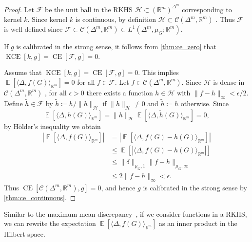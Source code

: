 \documentclass{article}
\DeclareMathOperator{\Expect}{\mathbb{E}}
\DeclareMathOperator{\measure}{CE}
\DeclareMathOperator{\kernelmeasure}{KCE}
\begin{document}
\begin{proof}
  Let $\mathcal{F}$ be the unit ball in the RKHS
  $\mathcal{H} \subset {(\mathbb{R}^m)}^{\Delta^m}$ corresponding to kernel $k$.
  Since kernel $k$ is continuous, by definition
  $\mathcal{H} \subset \mathcal{C}(\Delta^m, \mathbb{R}^m)$
  \citep[Definition~1]{carmeli10_vector_valued_reprod_kernel_hilber_spaces_univer}.
  Thus $\mathcal{F}$ is well defined since
  $\mathcal{F} \subset \mathcal{C}(\Delta^m, \mathbb{R}^m) \subset L^1(\Delta^m, \mu_G; \mathbb{R}^m)$.

  If $g$ is calibrated in the strong sense, it follows from \cref{thm:ce_zero}
  that $\kernelmeasure[k, g] = \measure[\mathcal{F}, g] = 0$.

  Assume that $\kernelmeasure[k, g] = \measure[\mathcal{F}, g] = 0$. This
  implies $\Expect[\langle \Delta, f(G)\rangle_{\mathbb{R}^m}] = 0$ for all
  $f \in \mathcal{F}$. Let $f \in \mathcal{C}(\Delta^m, \mathbb{R}^m)$. Since
  $\mathcal{H}$ is dense in $\mathcal{C}(\Delta^m, \mathbb{R}^m)$
  \citep[Theorem~1]{carmeli10_vector_valued_reprod_kernel_hilber_spaces_univer},
  for all $\epsilon > 0$ there exists a function $h \in \mathcal{H}$ with
  $\|f - h\|_{\infty} < \epsilon / 2$. Define $\tilde{h} \in \mathcal{F}$ by
  $\tilde{h} \coloneqq h / \|h\|_{\mathcal{H}}$ if $\|h\|_{\mathcal{H}} \neq 0$ and
  $\tilde{h} \coloneqq h$ otherwise. Since
  \begin{equation*}
    \Expect[\langle \Delta, h(G)\rangle_{\mathbb{R}^m}] = \|h\|_{\mathcal{H}} \Expect[\langle \Delta, \tilde{h}(G)\rangle_{\mathbb{R}^m}] = 0,
  \end{equation*}
  by Hölder's inequality we obtain
  \begin{equation*}
    \begin{split}
      |\Expect[\langle \Delta, f(G)\rangle_{\mathbb{R}^m}]| &= |\Expect[\langle \Delta, f(G) - h(G)\rangle_{\mathbb{R}^m}] |\\
      &\leq \Expect[|\langle \Delta, f(G) - h(G)\rangle_{\mathbb{R}^m}|] \\
      &\leq \|\delta\|_{\mu_G,1} \|f - h\|_{\mu_G,\infty} \\
      &\leq 2 \|f - h\|_{\infty} < \epsilon.
    \end{split}
  \end{equation*}
  Thus $\measure[\mathcal{C}(\Delta^m, \mathbb{R}^m), g] = 0$, and hence $g$ is
  calibrated in the strong sense by \cref{thm:ce_continuous}.
\end{proof}

Similar to the maximum mean discrepancy~\citep{gretton12_kernel_two_sampl_test},
if we consider functions in a RKHS, we can rewrite the expectation
$\Expect[\langle \Delta, f(G) \rangle_{\mathbb{R}^m}]$ as an inner product in
the Hilbert space.
\end{document}

